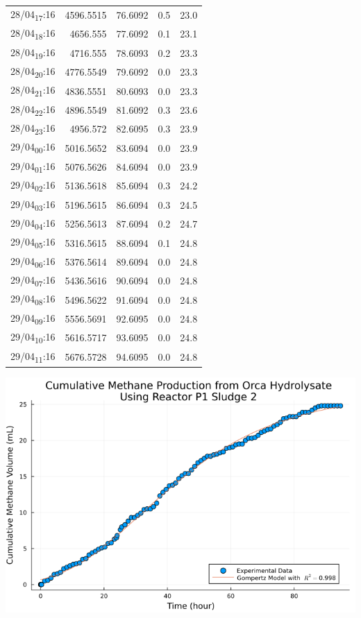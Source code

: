 \documentclass[11pt]{article}
\begin{document}
\begin{table}[htbp]
\begin{tabular}{lrrrr}
28/04\textsubscript{17}:16 & 4596.5515 & 76.6092 & 0.5 & 23.0\\[0pt]
28/04\textsubscript{18}:16 & 4656.555 & 77.6092 & 0.1 & 23.1\\[0pt]
28/04\textsubscript{19}:16 & 4716.555 & 78.6093 & 0.2 & 23.3\\[0pt]
28/04\textsubscript{20}:16 & 4776.5549 & 79.6092 & 0.0 & 23.3\\[0pt]
28/04\textsubscript{21}:16 & 4836.5551 & 80.6093 & 0.0 & 23.3\\[0pt]
28/04\textsubscript{22}:16 & 4896.5549 & 81.6092 & 0.3 & 23.6\\[0pt]
28/04\textsubscript{23}:16 & 4956.572 & 82.6095 & 0.3 & 23.9\\[0pt]
29/04\textsubscript{00}:16 & 5016.5652 & 83.6094 & 0.0 & 23.9\\[0pt]
29/04\textsubscript{01}:16 & 5076.5626 & 84.6094 & 0.0 & 23.9\\[0pt]
29/04\textsubscript{02}:16 & 5136.5618 & 85.6094 & 0.3 & 24.2\\[0pt]
29/04\textsubscript{03}:16 & 5196.5615 & 86.6094 & 0.3 & 24.5\\[0pt]
29/04\textsubscript{04}:16 & 5256.5613 & 87.6094 & 0.2 & 24.7\\[0pt]
29/04\textsubscript{05}:16 & 5316.5615 & 88.6094 & 0.1 & 24.8\\[0pt]
29/04\textsubscript{06}:16 & 5376.5614 & 89.6094 & 0.0 & 24.8\\[0pt]
29/04\textsubscript{07}:16 & 5436.5616 & 90.6094 & 0.0 & 24.8\\[0pt]
29/04\textsubscript{08}:16 & 5496.5622 & 91.6094 & 0.0 & 24.8\\[0pt]
29/04\textsubscript{09}:16 & 5556.5691 & 92.6095 & 0.0 & 24.8\\[0pt]
29/04\textsubscript{10}:16 & 5616.5717 & 93.6095 & 0.0 & 24.8\\[0pt]
29/04\textsubscript{11}:16 & 5676.5728 & 94.6095 & 0.0 & 24.8\\[0pt]
\end{tabular}
\end{table}

\begin{center}
\includegraphics[width=.9\linewidth]{../plots/BMPs/Orca Hydrolysate/methane_kinetics_orca_p1_s2_hour.png}
\end{center}
\end{document}
